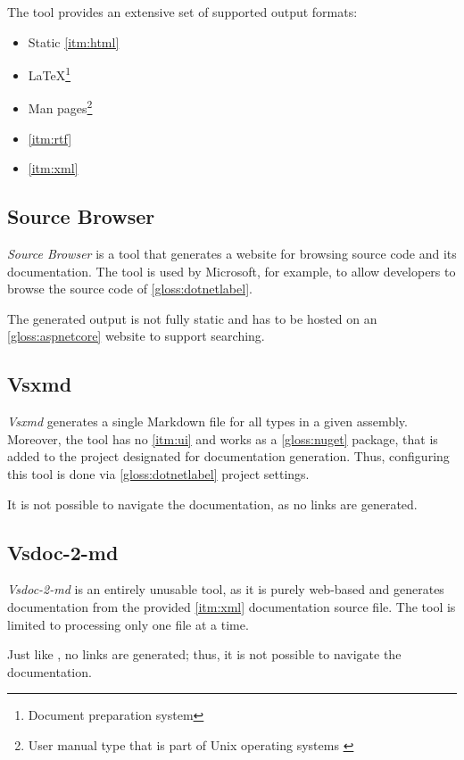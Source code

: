 The tool provides an extensive set of supported output formats:
\begin{itemize}
    \item Static \ref{itm:html}
    \item \LaTeX\footnote{Document preparation system}
    \item Man pages\footnote{User manual type that is part of Unix operating systems \cite{credocs_limited_latex_2022}}
    \item \ref{itm:rtf}
    \item \ref{itm:xml}
\end{itemize}

\subsection{Source Browser}

\textit{Source Browser} is a tool that generates a website for browsing source code and its documentation. The tool is used by Microsoft, for example, to allow developers to browse the source code of \ref{gloss:dotnetlabel}.

The generated output is not fully static and has to be hosted on an \ref{gloss:aspnetcore} website to support searching.

\subsection{Vsxmd} \label{ssec:vsxmd}

\textit{Vsxmd} generates a single Markdown file for all types in a given assembly. Moreover, the tool has no \ref{itm:ui} and works as a \ref{gloss:nuget} package, that is added to the project designated for documentation generation. Thus, configuring this tool is done via \ref{gloss:dotnetlabel} project settings.

It is not possible to navigate the documentation, as no links are generated.

\subsection{Vsdoc-2-md}

\textit{Vsdoc-2-md} is an entirely unusable tool, as it is purely web-based and generates documentation from the provided \ref{itm:xml} documentation source file. The tool is limited to processing only one file at a time.

Just like \textit{}, no links are generated; thus, it is not possible to navigate the documentation.

